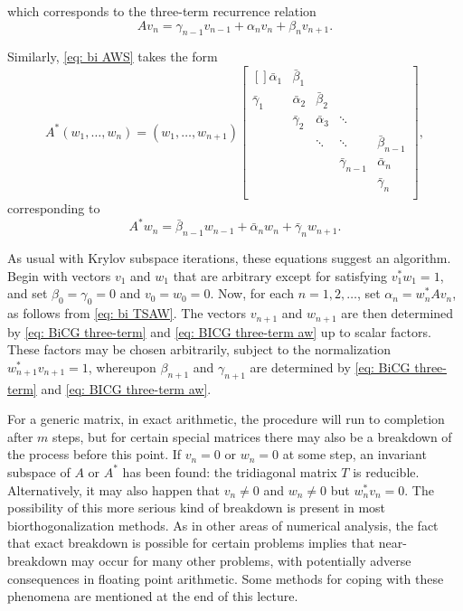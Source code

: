 which corresponds to the three-term recurrence relation 
\begin{equation}
\label{eq: BiCG three-term}
    Av_n = \gamma _{n-1}v_{n-1} + \alpha _n v_n + \beta _n v_{n+1}. 
\end{equation}

Similarly, \eqref{eq: bi AWS} takes the form 
\[
    A^* (w_1,\ldots ,w_n) = (w_1,\ldots ,w_{n+1}) \begin{bmatrix}[] 
        \bar \alpha _1 & \bar \beta _1 &  &  &   \\
        \bar \gamma _1 & \bar \alpha _2 & \bar \beta _2 &  &   \\
         & \bar \gamma_2 & \bar \alpha _3 & \ddots &   \\
         &  & \ddots & \ddots &  \bar \beta _{n-1} \\
         &  &  & \bar \gamma _{n-1}  &  \bar \alpha _n \\
         &  &  &  &  \bar \gamma _n \\
    \end{bmatrix}, 
\]
corresponding to 
\begin{equation}
\label{eq: BICG three-term aw}
    A^* w_n = \bar \beta _{n-1} w_{n-1} + \bar \alpha _n w_n + \bar \gamma _n w_{n+1}. 
\end{equation}

As usual with Krylov subspace iterations, these equations suggest an algorithm. Begin with vectors $v_1$ and $w_1$ that are arbitrary except for satisfying $v_1^* w_1=1$, and set $\beta_0=\gamma_0=0$ and $v_0=w_0=0$. Now, for each $n=1,2, \ldots$, set $\alpha_n=w_n^* A v_n$, as follows from \eqref{eq: bi TSAW}. The vectors $v_{n+1}$ and $w_{n+1}$ are then determined by \eqref{eq: BiCG three-term} and \eqref{eq: BICG three-term aw} up to scalar factors. These factors may be chosen arbitrarily, subject to the normalization $w_{n+1}^* v_{n+1}=1$, whereupon $\beta_{n+1}$ and $\gamma_{n+1}$ are determined by \eqref{eq: BiCG three-term} and \eqref{eq: BICG three-term aw}.  

For a generic matrix, in exact arithmetic, the procedure will run to completion after $m$ steps, but for certain special matrices there may also be a breakdown of the process before this point. If $v_n=0$ or $w_n=0$ at some step, an invariant subspace of $A$ or $A^*$ has been found: the tridiagonal matrix $T$ is reducible. Alternatively, it may also happen that $v_n \neq 0$ and $w_n \neq 0$ but $w_n^* v_n=0$. The possibility of this more serious kind of breakdown is present in most biorthogonalization methods. As in other areas of numerical analysis, the fact that exact breakdown is possible for certain problems implies that near-breakdown may occur for many other problems, with potentially adverse consequences in floating point arithmetic. Some methods for coping with these phenomena are mentioned at the end of this lecture.

